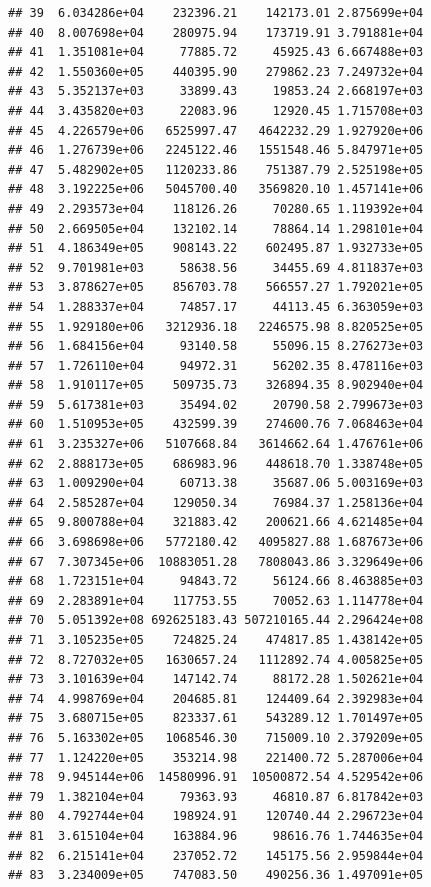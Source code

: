 \documentclass[
]{article}
\begin{document}
\begin{verbatim}
## 39  6.034286e+04    232396.21    142173.01 2.875699e+04
## 40  8.007698e+04    280975.94    173719.91 3.791881e+04
## 41  1.351081e+04     77885.72     45925.43 6.667488e+03
## 42  1.550360e+05    440395.90    279862.23 7.249732e+04
## 43  5.352137e+03     33899.43     19853.24 2.668197e+03
## 44  3.435820e+03     22083.96     12920.45 1.715708e+03
## 45  4.226579e+06   6525997.47   4642232.29 1.927920e+06
## 46  1.276739e+06   2245122.46   1551548.46 5.847971e+05
## 47  5.482902e+05   1120233.86    751387.79 2.525198e+05
## 48  3.192225e+06   5045700.40   3569820.10 1.457141e+06
## 49  2.293573e+04    118126.26     70280.65 1.119392e+04
## 50  2.669505e+04    132102.14     78864.14 1.298101e+04
## 51  4.186349e+05    908143.22    602495.87 1.932733e+05
## 52  9.701981e+03     58638.56     34455.69 4.811837e+03
## 53  3.878627e+05    856703.78    566557.27 1.792021e+05
## 54  1.288337e+04     74857.17     44113.45 6.363059e+03
## 55  1.929180e+06   3212936.18   2246575.98 8.820525e+05
## 56  1.684156e+04     93140.58     55096.15 8.276273e+03
## 57  1.726110e+04     94972.31     56202.35 8.478116e+03
## 58  1.910117e+05    509735.73    326894.35 8.902940e+04
## 59  5.617381e+03     35494.02     20790.58 2.799673e+03
## 60  1.510953e+05    432599.39    274600.76 7.068463e+04
## 61  3.235327e+06   5107668.84   3614662.64 1.476761e+06
## 62  2.888173e+05    686983.96    448618.70 1.338748e+05
## 63  1.009290e+04     60713.38     35687.06 5.003169e+03
## 64  2.585287e+04    129050.34     76984.37 1.258136e+04
## 65  9.800788e+04    321883.42    200621.66 4.621485e+04
## 66  3.698698e+06   5772180.42   4095827.88 1.687673e+06
## 67  7.307345e+06  10883051.28   7808043.86 3.329649e+06
## 68  1.723151e+04     94843.72     56124.66 8.463885e+03
## 69  2.283891e+04    117753.55     70052.63 1.114778e+04
## 70  5.051392e+08 692625183.43 507210165.44 2.296424e+08
## 71  3.105235e+05    724825.24    474817.85 1.438142e+05
## 72  8.727032e+05   1630657.24   1112892.74 4.005825e+05
## 73  3.101639e+04    147142.74     88172.28 1.502621e+04
## 74  4.998769e+04    204685.81    124409.64 2.392983e+04
## 75  3.680715e+05    823337.61    543289.12 1.701497e+05
## 76  5.163302e+05   1068546.30    715009.10 2.379209e+05
## 77  1.124220e+05    353214.98    221400.72 5.287006e+04
## 78  9.945144e+06  14580996.91  10500872.54 4.529542e+06
## 79  1.382104e+04     79363.93     46810.87 6.817842e+03
## 80  4.792744e+04    198924.91    120740.44 2.296723e+04
## 81  3.615104e+04    163884.96     98616.76 1.744635e+04
## 82  6.215141e+04    237052.72    145175.56 2.959844e+04
## 83  3.234009e+05    747083.50    490256.36 1.497091e+05

\end{verbatim}
\end{document}
